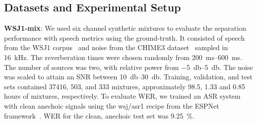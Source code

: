 \documentclass[a4paper]{article}
\begin{document}
\subsection{Datasets and Experimental Setup}
\label{subsec:setup}
\textbf{WSJ1-mix}:
We used six channel synthetic mixtures to evaluate the separation performance with speech metrics using the ground-truth.
It consisted of speech from the WSJ1 corpus~\cite{wsj1} and noise from the CHIME3 dataset~\cite{chime3} sampled in 16~kHz.
The reverberation times were chosen randomly from \SIrange{200}{600}{\milli\second}.
The number of sources was two, with relative power from \SIrange{-5}{5}{\decibel}.
The noise was scaled to attain an SNR between \SIrange{10}{30}{\decibel}.
Training, validation, and test sets contained 37416, 503, and 333 mixtures, approximately 98.5, 1.33 and 0.85 hours of mixtures, respectively.
To evaluate WER, we trained an ASR system with clean anechoic signals using the \textsf{wsj/asr1} recipe from the ESPNet framework~\cite{espnet}.
WER for the clean, anechoic test set was \SI{9.25}{\percent}.
\end{document}
